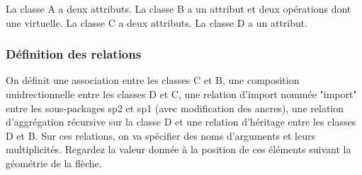 \documentclass[a4paper,11pt]{article}
\begin{document}
La classe A a deux attributs. La classe B a un attribut et deux opérations dont une virtuelle. La classe C a deux attributs. La classe D a un attribut.

\vspace{-0.4cm}
{\color{red!70!black}
\vspace{-0.4cm}
}
\vspace{-0.4cm}
{\color{red!70!black}
\vspace{-0.4cm}
}
\vspace{-0.4cm}
{\color{red!70!black}
\vspace{-0.4cm}
}


\begin{center}
\end{center}


\subsubsection{Définition des relations}

On définit une association entre les classes C et B, une composition unidrectionnelle entre les classes D et C, une relation d'import nommée "import" entre les sous-packages sp2 et sp1 (avec modification des ancres), une relation d'aggrégation récursive sur la classe D et une relation d'héritage entre les classes D et B. Sur ces relations, on va spécifier des noms d'arguments et leurs multiplicités. Regardez la valeur donnée à la position de ces éléments suivant la géométrie de la flèche.
\end{document}
